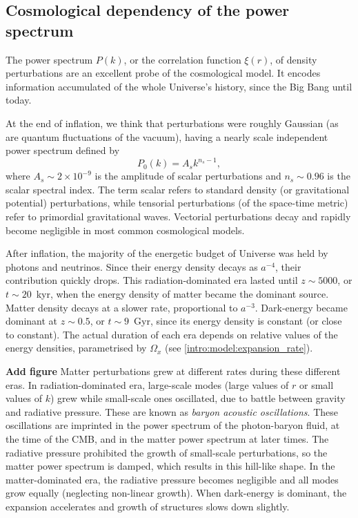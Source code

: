     \subsection{Cosmological dependency of the power spectrum}
    \label{intro:lss:cosmology_dependency}

    The power spectrum $P(k)$, or the correlation function $\xi(r)$, of density 
    perturbations are an excellent probe of the cosmological model. 
    It encodes information accumulated of the whole Universe's history, since the Big Bang
    until today.

    At the end of inflation, we think that perturbations were roughly Gaussian 
    (as are quantum fluctuations of the vacuum), 
    having a nearly scale independent power spectrum defined by
    \begin{equation}
        P_0(k) = A_s k^{n_s-1},
        \label{eq:initial_power_spectrum}
    \end{equation}
    where $A_s \sim 2 \times 10^{-9}$ is the amplitude of scalar perturbations 
    and $n_s \sim 0.96$ is the scalar spectral index. The term scalar refers to 
    standard density (or gravitational potential) perturbations, 
    while tensorial perturbations (of the space-time metric) refer to 
    primordial gravitational waves. Vectorial perturbations decay and rapidly become
    negligible in most common cosmological models. 

    After inflation, the majority of the energetic budget of Universe was held
    by photons and neutrinos. Since their energy density decays as $a^{-4}$, 
    their contribution quickly drops. This radiation-dominated era lasted until 
    $z \sim 5000$, or $t \sim 20$~kyr, when the energy density of matter became 
    the dominant source. Matter density decays at a slower rate, proportional to $a^{-3}$.
    Dark-energy became dominant at $z \sim 0.5$, or $t \sim 9$~Gyr, since its 
    energy density is constant (or close to constant).  
    The actual duration of each era depends on relative values of 
    the energy densities, parametrised by $\Omega_x$ 
    (see \ref{intro:model:expansion_rate}). 

    \textbf{ Add figure}
    Matter perturbations grew at different rates during these different eras.
    In radiation-dominated era, large-scale modes (large values of $r$ 
    or small values of $k$) grew while small-scale ones oscillated,
    due to battle between gravity and radiative pressure. 
    These are known as \emph{baryon acoustic oscillations}. These oscillations
    are imprinted in the power spectrum of the photon-baryon fluid, at the time of the CMB, 
    and in the matter power spectrum at later times. 
    The radiative pressure prohibited the growth of small-scale perturbations,
    so the matter power spectrum is damped, which results in this hill-like shape. 
    In the matter-dominated era, the radiative pressure becomes negligible 
    and all modes grow equally (neglecting non-linear growth). 
    When dark-energy is dominant, the expansion accelerates and 
    growth of structures slows down slightly. 
    
